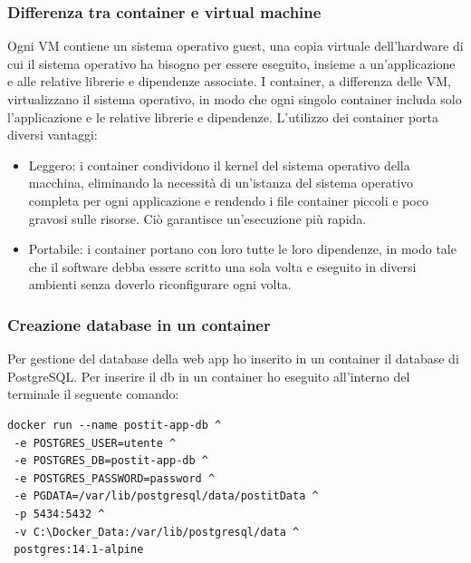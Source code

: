 \subsubsection{Differenza tra container e virtual machine}
Ogni VM contiene un sistema operativo guest, una copia virtuale dell'hardware di cui il sistema operativo ha bisogno per essere eseguito, insieme a un'applicazione e alle relative librerie e dipendenze associate.
I container, a differenza delle VM, virtualizzano il sistema operativo, in modo che ogni singolo container includa solo l'applicazione e le relative librerie e dipendenze.\cite{container}
L'utilizzo dei container porta diversi vantaggi:
\begin{itemize}
    \item Leggero: i container condividono il kernel del sistema operativo della macchina, eliminando la necessità di un'istanza del sistema operativo completa per ogni applicazione e rendendo i file container piccoli e poco gravosi sulle risorse. Ciò garantisce un'esecuzione più rapida.
    \item Portabile: i container portano con loro tutte le loro dipendenze, in modo tale che il software debba essere scritto una sola volta e eseguito in diversi ambienti senza doverlo riconfigurare ogni volta.
\end{itemize}

\subsubsection{Creazione database in un container}
Per gestione del database della web app ho inserito in un container il database di PostgreSQL.
Per inserire il db in un container ho eseguito all'interno del terminale il seguente comando:
\\
\begin{lstlisting}[language=xml]
docker run --name postit-app-db ^
 -e POSTGRES_USER=utente ^
 -e POSTGRES_DB=postit-app-db ^
 -e POSTGRES_PASSWORD=password ^
 -e PGDATA=/var/lib/postgresql/data/postitData ^
 -p 5434:5432 ^
 -v C:\Docker_Data:/var/lib/postgresql/data ^
 postgres:14.1-alpine
\end{lstlisting}
\newpage
